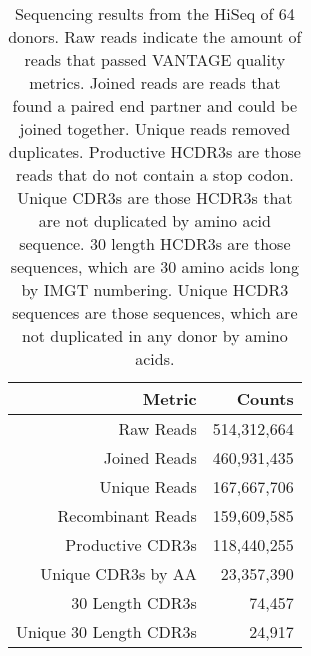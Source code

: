 \begin{SCtable}
\centering
\begin{tabular}{rr}
\toprule
\textbf{Metric}        & \textbf{Counts} \\
\midrule
Raw Reads              & 514,312,664     \\
Joined Reads           & 460,931,435     \\
Unique Reads           & 167,667,706     \\
Recombinant Reads      & 159,609,585     \\
Productive CDR3s       & 118,440,255     \\
Unique CDR3s by AA     & 23,357,390      \\
30 Length CDR3s        & 74,457          \\
Unique 30 Length CDR3s & 24,917         \\
\bottomrule
\end{tabular}
\caption[HiSeq 64-Donor Statistics]{Sequencing results from the HiSeq of 64 donors. Raw reads indicate the amount of reads that passed VANTAGE quality metrics. Joined reads are reads that found a paired end partner and could be joined together. Unique reads removed duplicates. Productive HCDR3s are those reads that do not contain a stop codon. Unique CDR3s are those HCDR3s that are not duplicated by amino acid sequence. 30 length HCDR3s are those sequences, which are 30 amino acids long by IMGT numbering. Unique HCDR3 sequences are those sequences, which are not duplicated in any donor by amino acids.}
\label{tab:table3_2}
\end{SCtable}